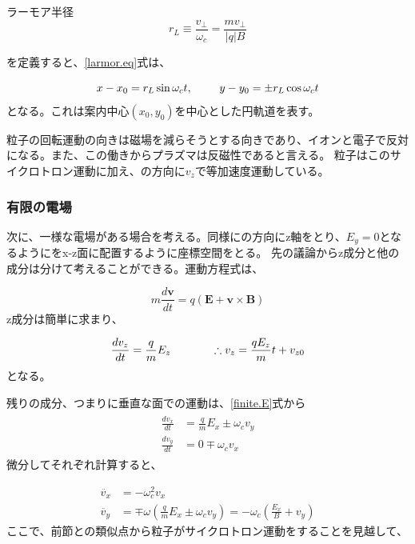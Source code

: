 \documentclass{ltjsarticle}
\numberwithin{equation}{section} %
\begin{document}
\begin{eqbox}{ラーモア半径}
\begin{equation}
  r_L \equiv \frac{v_\perp}{\omega_c} = \frac{mv_\perp}{|q|B} \label{larmor.radi}
\end{equation}
\end{eqbox}  
を定義すると、\eqref{larmor.eq}式は、

\begin{equation}
  x - x_0 = r_L \sin \omega_c t, \hspace{2pc} y -y_0 = \pm r_L \cos \omega_c t
\end{equation}
となる。これは案内中心$(x_0, y_0)$を中心とした円軌道を表す。

粒子の回転運動の向きは磁場を減らそうとする向きであり、イオンと電子で反対になる。また、この働きからプラズマは反磁性であると言える。
粒子はこのサイクロトロン運動に加え、の方向に$v_z$で等加速度運動している。

\subsubsection{有限の電場}
次に、一様な電場がある場合を考える。同様にの方向にz軸をとり、$E_y=0$となるようにをx-z面に配置するように座標空間をとる。
先の議論からz成分と他の成分は分けて考えることができる。運動方程式は、

\begin{equation}
  m\frac{d\bm{v}}{dt} = q(\bm{E} + \bm{v}\times \bm{B}) \label{finite.E}
\end{equation}
z成分は簡単に求まり、

\begin{equation}
  \frac{dv_z}{dt} = \frac{q}{m}E_z \hspace{3pc} \therefore v_z = \frac{qE_z}{m}t + v_{z0}
\end{equation}
となる。

残りの成分、つまりに垂直な面での運動は、\eqref{finite.E}式から
\begin{align}
  \begin{split}
    \frac{dv_x}{dt} &= \frac{q}{m}E_x \pm \omega_c v_y\\
    \frac{dv_y}{dt} &= 0 \mp \omega_c v_x
  \end{split}
\end{align}
微分してそれぞれ計算すると、

\begin{subequations}
  \begin{align}
    \ddot{v_x} &= -\omega_c^2v_x\\
    \ddot{v_y} &= \mp \omega\left(\frac{q}{m}E_x \pm \omega_c v_y\right) = -\omega_c\left(\frac{E_x}{B}+v_y\right) \label{v_e.eq}
  \end{align}
\end{subequations}
  ここで、前節との類似点から粒子がサイクロトロン運動をすることを見越して、
\end{document}
